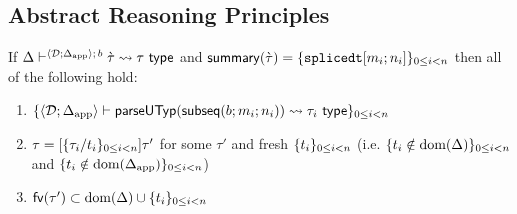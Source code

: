 \subsection{Abstract Reasoning Principles}\label{appendix:SES-reasoning-principles}
\begin{lemma} 
\label{thm:proto-type-expansion-decomposition-SES}
If $\Delta\vdash^{\langle \mathcal{D}; \Delta_\text{app} \rangle;\,b} \grave{\tau} \leadsto \tau~\mathsf{type}$ and $\mathsf{summary}(\grave{\tau}) = \{\texttt{splicedt}[m_i; n_i]\}_{0 \leq i < n}$ then all of the following hold:
\begin{enumerate}
\item $\{\langle \mathcal{D}; \Delta_\text{app} \rangle \vdash 
  \mathsf{parseUTyp}(\mathsf{subseq}(b; m_i; n_i))
 \leadsto \tau_i~\mathsf{type}\}_{0 \leq i < n}$
\item $\tau = [\{\tau_i/t_i\}_{0 \leq i < n}]\tau'$ for some $\tau'$ and fresh $\{t_i\}_{0 \leq i < n}$ (i.e.  $\{t_i \notin \text{dom}(\Delta)\}_{0 \leq i < n}$ and $\{t_i \notin \text{dom}(\Delta_\text{app})\}_{0 \leq i < n}$)
\item $\mathsf{fv}(\tau') \subset \text{dom}(\Delta) \cup \{t_i\}_{0 \leq i < n}$
\end{enumerate}
\end{lemma}
